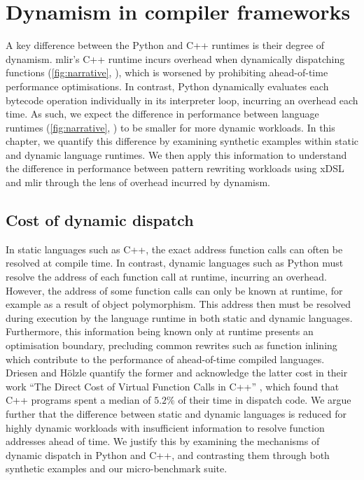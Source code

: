 \chapter{Dynamism in compiler frameworks}
\label{chap:dynamism-pattern-rewriting}

A key difference between the Python and C++ runtimes is their degree of dynamism.
\ac{mlir}'s C++ runtime incurs overhead when dynamically dispatching functions (\autoref{fig:narrative}, ), which is worsened by prohibiting ahead-of-time performance optimisations.
In contrast, Python dynamically evaluates each bytecode operation individually in its interpreter loop, incurring an overhead each time. %
As such, we expect the difference in performance between language runtimes (\autoref{fig:narrative}, ) to be smaller for more dynamic workloads.
In this chapter, we quantify this difference by examining synthetic examples within static and dynamic language runtimes. We then apply this information to understand the difference in performance between pattern rewriting workloads using xDSL and \ac{mlir} through the lens of overhead incurred by dynamism.


\section{Cost of dynamic dispatch}
\label{sec:dynamism-pattern-rewriting-dispatch}

In static languages such as C++, the exact address function calls can often be resolved at compile time. In contrast, dynamic languages such as Python must resolve the address of each function call at runtime, incurring an overhead.
However, the address of some function calls can only be known at runtime, for example as a result of object polymorphism. This address then must be resolved during execution by the language runtime in both static and dynamic languages. Furthermore, this information being known only at runtime presents an optimisation boundary, precluding common rewrites such as function inlining which contribute to the performance of ahead-of-time compiled languages.
Driesen and H\"olzle quantify the former and acknowledge the latter cost in their work ``The Direct Cost of Virtual Function Calls in C++'' \cite{driesenDirectCostVirtual1996}, which found that C++ programs spent a median of $5.2\%$ of their time in dispatch code. %
We argue further that the difference between static and dynamic languages is reduced for highly dynamic workloads with insufficient information to resolve function addresses ahead of time.
We justify this by examining the mechanisms of dynamic dispatch in Python and C++, and contrasting them through both synthetic examples and our micro-benchmark suite.

